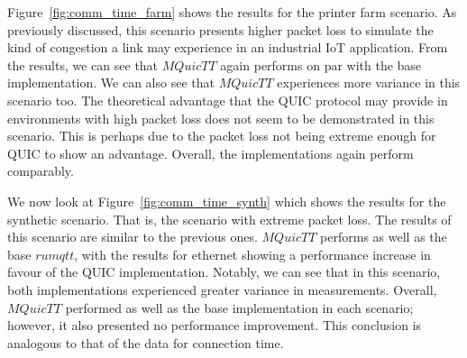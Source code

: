 Figure~\ref{fig:comm_time_farm} shows the results for the printer farm scenario.
As previously discussed, this scenario presents higher packet loss to simulate the kind of congestion a link may experience in an industrial IoT application.
From the results, we can see that $MQuicTT$ again performs on par with the base implementation.
We can also see that $MQuicTT$ experiences more variance in this scenario too.
The theoretical advantage that the QUIC protocol may provide in environments with high packet loss does not seem to be demonstrated in this scenario.
This is perhaps due to the packet loss not being extreme enough for QUIC to show an advantage.
Overall, the implementations again perform comparably.

We now look at Figure~\ref{fig:comm_time_synth} which shows the results for the synthetic scenario.
That is, the scenario with extreme packet loss.
The results of this scenario are similar to the previous ones.
$MQuicTT$ performs as well as the base $rumqtt$, with the results for ethernet showing a performance increase in favour of the QUIC implementation.
Notably, we can see that in this scenario, both implementations experienced greater variance in measurements.
Overall, $MQuicTT$ performed as well as the base implementation in each scenario; however, it also presented no performance improvement.
This conclusion is analogous to that of the data for connection time.